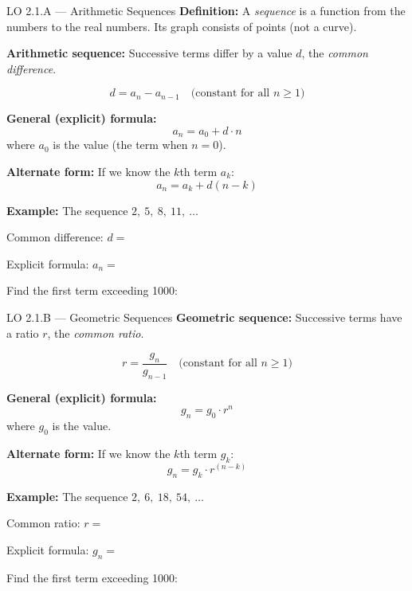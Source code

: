\documentclass[10pt]{article}
\begin{document}
\begin{notesbox}{LO 2.1.A --- Arithmetic Sequences}
\textbf{Definition:} A \textit{sequence} is a function from the \blank{3cm} numbers to the real numbers.
Its graph consists of \blank{3cm} points (not a curve).

\medskip
\textbf{Arithmetic sequence:} Successive terms differ by a \blank{4cm} value $d$, the
\textit{common difference}.

\[
  d = a_n - a_{n-1} \quad \text{(constant for all } n \geq 1\text{)}
\]

\textbf{General (explicit) formula:}
\[
  a_n = a_0 + d \cdot n
\]
where $a_0$ is the \blank{3cm} value (the term when $n = 0$).

\medskip
\textbf{Alternate form:} If we know the $k$th term $a_k$:
\[
  a_n = a_k + d(n - k)
\]

\medskip
\textbf{Example:} The sequence $2,\ 5,\ 8,\ 11,\ \ldots$

\smallskip
Common difference: $d = $ \blank{2cm}

\smallskip
Explicit formula: $a_n = $ \blank{5cm}

\smallskip
Find the first term exceeding 1000: \blank{6cm}
\end{notesbox}

\vspace{0.04in}

\begin{notesbox}{LO 2.1.B --- Geometric Sequences}
\textbf{Geometric sequence:} Successive terms have a \blank{4cm} ratio $r$, the
\textit{common ratio}.

\[
  r = \frac{g_n}{g_{n-1}} \quad \text{(constant for all } n \geq 1\text{)}
\]

\textbf{General (explicit) formula:}
\[
  g_n = g_0 \cdot r^n
\]
where $g_0$ is the \blank{3cm} value.

\medskip
\textbf{Alternate form:} If we know the $k$th term $g_k$:
\[
  g_n = g_k \cdot r^{(n-k)}
\]

\medskip
\textbf{Example:} The sequence $2,\ 6,\ 18,\ 54,\ \ldots$

\smallskip
Common ratio: $r = $ \blank{2cm}

\smallskip
Explicit formula: $g_n = $ \blank{5cm}

\smallskip
Find the first term exceeding 1000: \blank{6cm}
\end{notesbox}

\vspace{0.04in}
\end{document}
